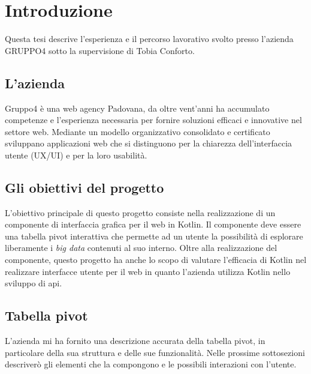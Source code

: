 
\chapter{Introduzione}
\label{cap:introduzione}

Questa tesi descrive l'esperienza e il percorso lavorativo svolto presso l'azienda GRUPPO4 sotto la supervisione di Tobia Conforto.

\section{L'azienda}
Gruppo4 è una web agency Padovana, da oltre vent'anni ha accumulato competenze e l'esperienza necessaria per fornire soluzioni efficaci e innovative nel settore web. Mediante un modello organizzativo consolidato e certificato sviluppano applicazioni web che si distinguono per la chiarezza dell'interfaccia utente (UX/UI) e per la loro usabilità.

\section{Gli obiettivi del progetto}
L'obiettivo principale di questo progetto consiste nella realizzazione di un componente di interfaccia grafica per il web in Kotlin. Il componente deve essere una tabella pivot interattiva che permette ad un utente la possibilità di esplorare liberamente i \emph{big data} contenuti al suo interno. Oltre alla realizzazione del componente, questo progetto ha anche lo scopo di valutare l'efficacia di Kotlin nel realizzare interfacce utente per il web in quanto l'azienda utilizza Kotlin nello sviluppo di \gls{api}.

\section{Tabella pivot}
L'azienda mi ha fornito una descrizione accurata della tabella pivot, in particolare della sua struttura e delle sue funzionalità. Nelle prossime sottosezioni descriverò gli elementi che la compongono e le possibili interazioni con l'utente.

